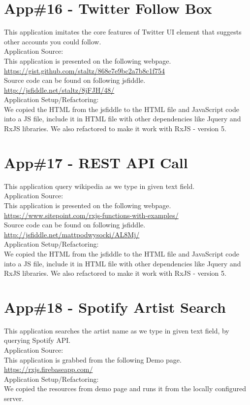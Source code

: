 \section{App\#16 - Twitter Follow Box}
This application imitates the core features of Twitter UI element that suggests other accounts you could follow.\\
Application Source: \\
This application is presented on the following webpage.\\
\url{https://gist.github.com/staltz/868e7e9bc2a7b8c1f754}\\
Source code can be found on following jsfiddle.
\url{http://jsfiddle.net/staltz/8jFJH/48/} \\
Application Setup/Refactoring: \\
We copied the HTML from the jsfiddle to the HTML file and JavaScript code into a JS file, include it in HTML file with other dependencies like Jquery and RxJS libraries.
We also refactored to make it work with RxJS - version 5.


\section{App\#17 - REST API Call }
This application query wikipedia as we type in given text field.\\
Application Source: \\
This application is presented on the following webpage.\\
\url{https://www.sitepoint.com/rxjs-functions-with-examples/}\\
Source code can be found on following jsfiddle.\\
\url{http://jsfiddle.net/mattpodwysocki/AL8Mj/} \\
Application Setup/Refactoring: \\
We copied the HTML from the jsfiddle to the HTML file and JavaScript code into a JS file, include it in HTML file with other dependencies like Jquery and RxJS libraries.
We also refactored to make it work with RxJS - version 5.

\section{App\#18 - Spotify Artist Search }
This application searches the artist name as we type in given text field, by querying Spotify API.\\
Application Source: \\
This application is grabbed from the following Demo page.\\
\url{https://rxjs.firebaseapp.com/}\\
Application Setup/Refactoring: \\
We copied the resources from demo page and runs it from the locally configured server.

